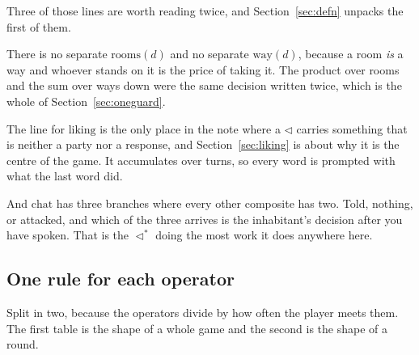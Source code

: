 \documentclass[11pt,a4paper]{article}
\newcommand{\seqb}{\lhd^{\ast}}
\begin{document}
Three of those lines are worth reading twice, and Section~\ref{sec:defn} unpacks the first of
them.

There is no separate $\text{rooms}(d)$ and no separate $\text{way}(d)$, because a room \emph{is} a
way and whoever stands on it is the price of taking it. The product over rooms and the sum over
ways down were the same decision written twice, which is the whole of
Section~\ref{sec:oneguard}.

The line for $\text{liking}$ is the only place in the note where a $\lhd$ carries something that is
neither a party nor a response, and Section~\ref{sec:liking} is about why it is the centre of the
game. It accumulates over turns, so every word is prompted with what the last word did.

And $\text{chat}$ has three branches where every other composite has two. Told, nothing, or
attacked, and which of the three arrives is the inhabitant's decision after you have spoken. That
is the $\seqb$ doing the most work it does anywhere here.

\subsection{One rule for each operator}

Split in two, because the operators divide by how often the player meets them. The first table is
the shape of a whole game and the second is the shape of a round.
\end{document}
